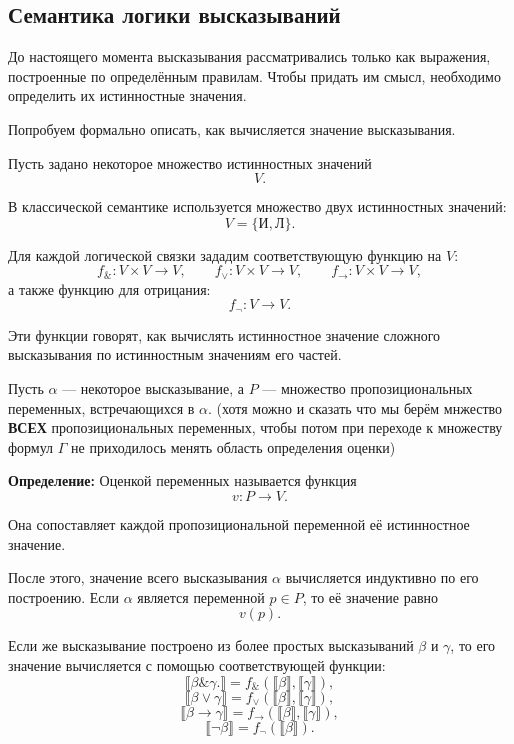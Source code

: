 \documentclass[12pt,a4paper,oneside,openany]{book}
\theoremstyle{definition}
\theoremstyle{plain}
\theoremstyle{remark}
\begin{document}
\subsection{Семантика логики высказываний}

До настоящего момента высказывания рассматривались только как выражения,
построенные по определённым правилам. Чтобы придать им смысл, необходимо
определить их истинностные значения.


Попробуем формально описать, как вычисляется значение высказывания.

Пусть задано некоторое множество истинностных значений
\[
V.
\]

В классической семантике используется множество двух истинностных
значений:
\[
V=\{\text{И},\text{Л}\}.
\]


Для каждой логической связки зададим соответствующую функцию на $V$:
\[
f_{\mathbin{\&}}:V\times V\to V,
\qquad
f_{\vee}:V\times V\to V,
\qquad
f_{\to}:V\times V\to V,
\]
а также функцию для отрицания:
\[
f_{\neg}:V\to V.
\]

Эти функции говорят, как вычислять истинностное значение сложного высказывания по истинностным значениям его частей.

\vspace{7mm}

Пусть $\alpha$ — некоторое высказывание, а $P$ — множество пропозициональных переменных, встречающихся в $\alpha$. (хотя можно и сказать что мы берём мнжество \textbf{ВСЕХ} пропозициональных переменных, чтобы потом при переходе к множеству формул \(\Gamma\) не приходилось менять область определения оценки)

\textbf{Определение:} Оценкой переменных называется функция
\[
v:P\to V.
\]

Она сопоставляет каждой пропозициональной переменной её истинностное значение.

После этого, значение всего высказывания $\alpha$ вычисляется индуктивно по его построению. Если $\alpha$ является переменной $p\in P$, то её значение равно
\[
v(p).
\]

Если же высказывание построено из более простых высказываний $\beta$ и $\gamma$, то его значение вычисляется с помощью соответствующей функции:
\[
\llbracket \beta\mathbin{\&}\gamma.\rrbracket
=
f_{\mathbin{\&}}(\llbracket\beta\rrbracket,\llbracket\gamma\rrbracket),
\]
\[
\llbracket \beta\vee\gamma\rrbracket
=
f_{\vee}(\llbracket\beta\rrbracket,\llbracket\gamma\rrbracket),
\]
\[
\llbracket \beta\to\gamma\rrbracket
=
f_{\to}(\llbracket\beta\rrbracket,\llbracket\gamma\rrbracket),
\]
\[
\llbracket \neg\beta\rrbracket
=
f_{\neg}(\llbracket\beta\rrbracket).
\]
\end{document}
